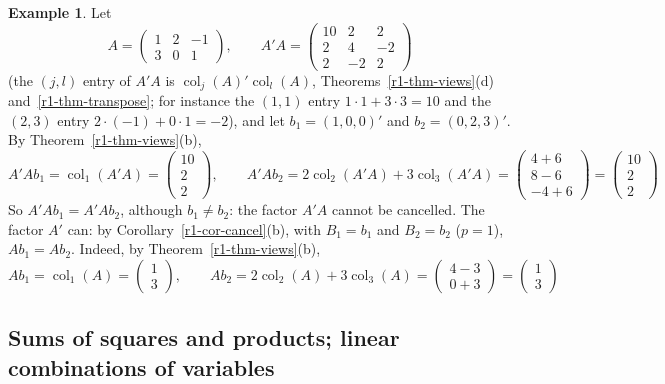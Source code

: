 \documentclass[12pt]{article}
\DeclareMathOperator{\col}{col}
\theoremstyle{definition}
\newtheorem{example}[theorem]{Example}
\begin{document}
\begin{example}\label{r1-exm-cancel-law}
Let
\[
A=\begin{pmatrix}1&2&-1\\3&0&1\end{pmatrix},\qquad A'A=\begin{pmatrix}10&2&2\\2&4&-2\\2&-2&2\end{pmatrix}
\]
(the \((j,l)\) entry of \(A'A\) is \(\col_j(A)'\col_l(A)\), Theorems~\ref{r1-thm-views}(d) and~\ref{r1-thm-transpose};
for instance the \((1,1)\) entry \(1\cdot1+3\cdot3=10\) and the \((2,3)\) entry \(2\cdot(-1)+0\cdot1=-2\)), and let
\(b_1=(1,0,0)'\) and \(b_2=(0,2,3)'\). By Theorem~\ref{r1-thm-views}(b),
\[
A'Ab_1=\col_1(A'A)=\begin{pmatrix}10\\2\\2\end{pmatrix},\qquad
A'Ab_2=2\col_2(A'A)+3\col_3(A'A)=\begin{pmatrix}4+6\\8-6\\-4+6\end{pmatrix}=\begin{pmatrix}10\\2\\2\end{pmatrix}
\]
So \(A'Ab_1=A'Ab_2\), although \(b_1\ne b_2\): the factor \(A'A\) cannot be cancelled. The factor \(A'\) can: by
Corollary~\ref{r1-cor-cancel}(b), with \(B_1=b_1\) and \(B_2=b_2\) (\(p=1\)), \(Ab_1=Ab_2\). Indeed, by
Theorem~\ref{r1-thm-views}(b),
\[
Ab_1=\col_1(A)=\begin{pmatrix}1\\3\end{pmatrix},\qquad
Ab_2=2\col_2(A)+3\col_3(A)=\begin{pmatrix}4-3\\0+3\end{pmatrix}=\begin{pmatrix}1\\3\end{pmatrix}
\]
\end{example}

\subsection*{Sums of squares and products; linear combinations of variables}
\end{document}
